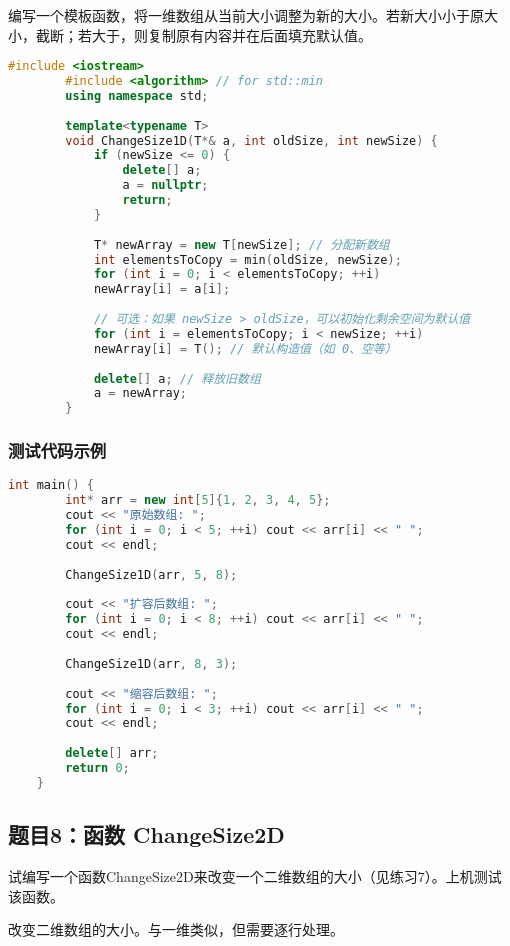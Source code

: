 \documentclass[UTF8]{ctexart}
\begin{document}
	编写一个模板函数，将一维数组从当前大小调整为新的大小。若新大小小于原大小，截断；若大于，则复制原有内容并在后面填充默认值。
	
	\begin{lstlisting}[language=C++]
		#include <iostream>
		#include <algorithm> // for std::min
		using namespace std;
		
		template<typename T>
		void ChangeSize1D(T*& a, int oldSize, int newSize) {
			if (newSize <= 0) {
				delete[] a;
				a = nullptr;
				return;
			}
			
			T* newArray = new T[newSize]; // 分配新数组
			int elementsToCopy = min(oldSize, newSize);
			for (int i = 0; i < elementsToCopy; ++i)
			newArray[i] = a[i];
			
			// 可选：如果 newSize > oldSize，可以初始化剩余空间为默认值
			for (int i = elementsToCopy; i < newSize; ++i)
			newArray[i] = T(); // 默认构造值（如 0、空等）
			
			delete[] a; // 释放旧数组
			a = newArray;
		}
	\end{lstlisting}
	
	\subsubsection{测试代码示例}
	\begin{lstlisting}[language=C++]
	int main() {
		int* arr = new int[5]{1, 2, 3, 4, 5};
		cout << "原始数组: ";
		for (int i = 0; i < 5; ++i) cout << arr[i] << " ";
		cout << endl;
		
		ChangeSize1D(arr, 5, 8);
		
		cout << "扩容后数组: ";
		for (int i = 0; i < 8; ++i) cout << arr[i] << " ";
		cout << endl;
		
		ChangeSize1D(arr, 8, 3);
		
		cout << "缩容后数组: ";
		for (int i = 0; i < 3; ++i) cout << arr[i] << " ";
		cout << endl;
		
		delete[] arr;
		return 0;
	}
\end{lstlisting}
	
	\subsection{题目8：函数 ChangeSize2D}试编写一个函数ChangeSize2D来改变一个二维数组的大小（见练习7）。上机测试该函数。
	
	
	改变二维数组的大小。与一维类似，但需要逐行处理。
	
\end{document}
